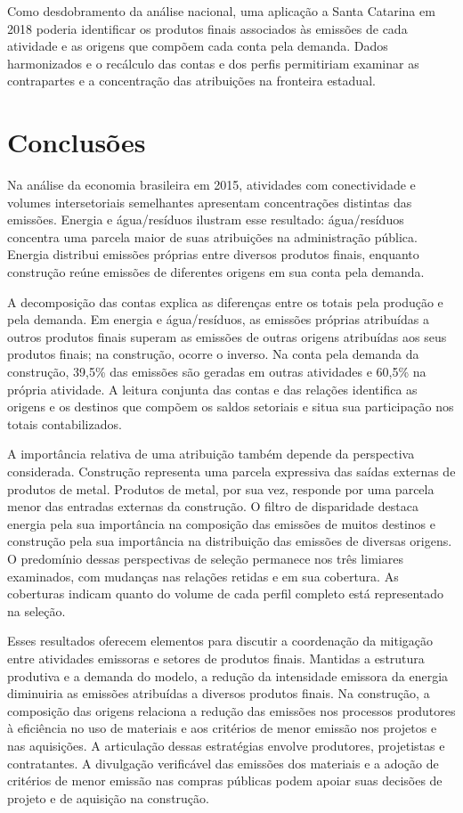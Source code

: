 \documentclass[11pt]{article}
\begin{document}
Como desdobramento da análise nacional, uma aplicação a Santa Catarina em 2018 poderia identificar os produtos finais associados às emissões de cada atividade e as origens que compõem cada conta pela demanda. Dados harmonizados e o recálculo das contas e dos perfis permitiriam examinar as contrapartes e a concentração das atribuições na fronteira estadual.

\clearpage
\section{Conclusões}

Na análise da economia brasileira em 2015, atividades com conectividade e volumes intersetoriais semelhantes apresentam concentrações distintas das emissões. Energia e água/resíduos ilustram esse resultado: água/resíduos concentra uma parcela maior de suas atribuições na administração pública. Energia distribui emissões próprias entre diversos produtos finais, enquanto construção reúne emissões de diferentes origens em sua conta pela demanda.

A decomposição das contas explica as diferenças entre os totais pela produção e pela demanda. Em energia e água/resíduos, as emissões próprias atribuídas a outros produtos finais superam as emissões de outras origens atribuídas aos seus produtos finais; na construção, ocorre o inverso. Na conta pela demanda da construção, 39,5\% das emissões são geradas em outras atividades e 60,5\% na própria atividade. A leitura conjunta das contas e das relações identifica as origens e os destinos que compõem os saldos setoriais e situa sua participação nos totais contabilizados.

A importância relativa de uma atribuição também depende da perspectiva considerada. Construção representa uma parcela expressiva das saídas externas de produtos de metal. Produtos de metal, por sua vez, responde por uma parcela menor das entradas externas da construção. O filtro de disparidade destaca energia pela sua importância na composição das emissões de muitos destinos e construção pela sua importância na distribuição das emissões de diversas origens. O predomínio dessas perspectivas de seleção permanece nos três limiares examinados, com mudanças nas relações retidas e em sua cobertura. As coberturas indicam quanto do volume de cada perfil completo está representado na seleção.

Esses resultados oferecem elementos para discutir a coordenação da mitigação entre atividades emissoras e setores de produtos finais. Mantidas a estrutura produtiva e a demanda do modelo, a redução da intensidade emissora da energia diminuiria as emissões atribuídas a diversos produtos finais. Na construção, a composição das origens relaciona a redução das emissões nos processos produtores à eficiência no uso de materiais e aos critérios de menor emissão nos projetos e nas aquisições. A articulação dessas estratégias envolve produtores, projetistas e contratantes. A divulgação verificável das emissões dos materiais e a adoção de critérios de menor emissão nas compras públicas podem apoiar suas decisões de projeto e de aquisição na construção.
\end{document}
